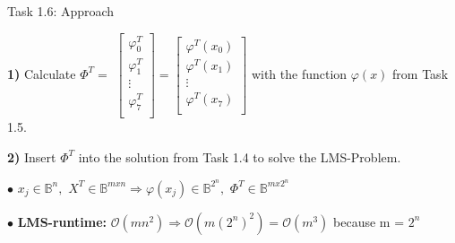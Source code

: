 \documentclass[aspectratio=169]{beamer}
\begin{document}
\begin{frame}{Task 1.6: Approach}

\textbf{1)} Calculate $\Phi^T = $
$\begin{bmatrix}
\varphi^T_0\\
\varphi^T_1\\
\vdots\\
\varphi^T_7\\
\end{bmatrix} =
\begin{bmatrix}
\varphi^T(x_0)\\
\varphi^T(x_1)\\
\vdots\\
\varphi^T(x_7)\\
\end{bmatrix}$
with the function $\varphi(x)$ from Task 1.5.\newline

\textbf{2)} Insert $\Phi^T$ into the solution from Task 1.4 to solve the LMS-Problem.\newline\newline

$\bullet$ $x_j \in \mathbb{B}^n,$ $X^T \in \mathbb{B}^{mxn}\Rightarrow \varphi(x_j) \in \mathbb{B}^{2^n},$ $\Phi^T \in \mathbb{B}^{mx2^n}$\newline

$\bullet$ \textbf{LMS-runtime:} $\mathcal{O}(mn^2)\Rightarrow \mathcal{O}(m(2^n)^2) = \mathcal{O}(m^{3})$ because m = $2^n$

\end{frame}
\end{document}
